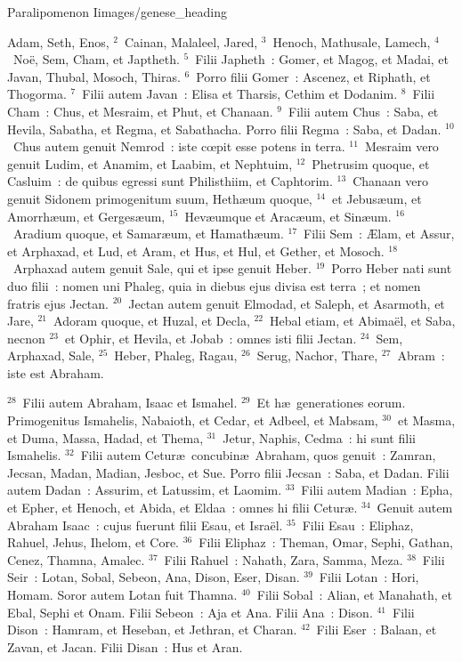 {Paralipomenon I}{images/genese_heading}


\lettrine[lines=10,image=true,loversize=0.05,lraise=-0.03]{A}{}dam, Seth, Enos,
${}^{2}$~Cainan, Malaleel, Jared,
${}^{3}$~Henoch, Mathusale, Lamech,
${}^{4}$~No\"e, Sem, Cham, et Japtheth.
${}^{5}$~Filii Japheth~: Gomer, et Magog, et Madai, et Javan, Thubal, Mosoch, Thiras.
${}^{6}$~Porro filii Gomer~: Ascenez, et Riphath, et Thogorma.
${}^{7}$~Filii autem Javan~: Elisa et Tharsis, Cethim et Dodanim.
${}^{8}$~Filii Cham~: Chus, et Mesraim, et Phut, et Chanaan.
${}^{9}$~Filii autem Chus~: Saba, et Hevila, Sabatha, et Regma, et Sabathacha. Porro filii Regma~: Saba, et Dadan.
${}^{10}$~Chus autem genuit Nemrod~: iste cœpit esse potens in terra.
${}^{11}$~Mesraim vero genuit Ludim, et Anamim, et Laabim, et Nephtuim,
${}^{12}$~Phetrusim quoque, et Casluim~: de quibus egressi sunt Philisthiim, et Caphtorim.
${}^{13}$~Chanaan vero genuit Sidonem primogenitum suum, Heth\ae um quoque,
${}^{14}$~et Jebus\ae um, et Amorrh\ae um, et Gerges\ae um,
${}^{15}$~Hev\ae umque et Arac\ae um, et Sin\ae um.
${}^{16}$~Aradium quoque, et Samar\ae um, et Hamath\ae um.
${}^{17}$~Filii Sem~: \AE lam, et Assur, et Arphaxad, et Lud, et Aram, et Hus, et Hul, et Gether, et Mosoch.
${}^{18}$~Arphaxad autem genuit Sale, qui et ipse genuit Heber.
${}^{19}$~Porro Heber nati sunt duo filii~: nomen uni Phaleg, quia in diebus ejus divisa est terra~; et nomen fratris ejus Jectan.
${}^{20}$~Jectan autem genuit Elmodad, et Saleph, et Asarmoth, et Jare,
${}^{21}$~Adoram quoque, et Huzal, et Decla,
${}^{22}$~Hebal etiam, et Abima\"el, et Saba, necnon
${}^{23}$~et Ophir, et Hevila, et Jobab~: omnes isti filii Jectan.
${}^{24}$~Sem, Arphaxad, Sale,
${}^{25}$~Heber, Phaleg, Ragau,
${}^{26}$~Serug, Nachor, Thare,
${}^{27}$~Abram~: iste est Abraham.


${}^{28}$~Filii autem Abraham, Isaac et Ismahel.
${}^{29}$~Et h\ae\ generationes eorum. Primogenitus Ismahelis, Nabaioth, et Cedar, et Adbeel, et Mabsam,
${}^{30}$~et Masma, et Duma, Massa, Hadad, et Thema,
${}^{31}$~Jetur, Naphis, Cedma~: hi sunt filii Ismahelis.
${}^{32}$~Filii autem Cetur\ae\ concubin\ae\ Abraham, quos genuit~: Zamran, Jecsan, Madan, Madian, Jesboc, et Sue. Porro filii Jecsan~: Saba, et Dadan. Filii autem Dadan~: Assurim, et Latussim, et Laomim.
${}^{33}$~Filii autem Madian~: Epha, et Epher, et Henoch, et Abida, et Eldaa~: omnes hi filii Cetur\ae .
${}^{34}$~Genuit autem Abraham Isaac~: cujus fuerunt filii Esau, et Isra\"el.
${}^{35}$~Filii Esau~: Eliphaz, Rahuel, Jehus, Ihelom, et Core.
${}^{36}$~Filii Eliphaz~: Theman, Omar, Sephi, Gathan, Cenez, Thamna, Amalec.
${}^{37}$~Filii Rahuel~: Nahath, Zara, Samma, Meza.
${}^{38}$~Filii Seir~: Lotan, Sobal, Sebeon, Ana, Dison, Eser, Disan.
${}^{39}$~Filii Lotan~: Hori, Homam. Soror autem Lotan fuit Thamna.
${}^{40}$~Filii Sobal~: Alian, et Manahath, et Ebal, Sephi et Onam. Filii Sebeon~: Aja et Ana. Filii Ana~: Dison.
${}^{41}$~Filii Dison~: Hamram, et Heseban, et Jethran, et Charan.
${}^{42}$~Filii Eser~: Balaan, et Zavan, et Jacan. Filii Disan~: Hus et Aran.


